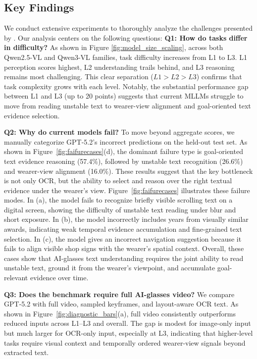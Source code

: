 \documentclass[11pt]{article}
\theoremstyle{plain}
\theoremstyle{definition}
\theoremstyle{remark}
\begin{document}
\subsection{Key Findings}
We conduct extensive experiments to thoroughly analyze the challenges presented by \dataset.  Our analysis centers on the following questions: 
\noindent\textbf{Q1: How do tasks differ in difficulty?}
As shown in Figure \ref{fig:model_size_scaling}, across both Qwen2.5-VL and Qwen3-VL families, task difficulty increases from L1 to L3. L1 perception scores highest, L2 understanding trails behind, and L3 reasoning remains most challenging. This clear separation ($L1 > L2 > L3$) confirms that task complexity grows with each level. Notably, the substantial performance gap between L1 and L3 (up to 20 points) suggests that current MLLMs struggle to move from reading unstable text to wearer-view alignment and goal-oriented text evidence selection.




\noindent\textbf{Q2: Why do current models fail?}
To move beyond aggregate scores, we manually categorize GPT-5.2's incorrect predictions on the held-out test set. As shown in Figure~\ref{fig:faifurecases}(d), the dominant failure type is {goal-oriented text evidence reasoning} (57.4\%), followed by {unstable text recognition} (26.6\%) and {wearer-view alignment} (16.0\%). These results suggest that the key bottleneck is not only OCR, but the ability to select and reason over the right textual evidence under the wearer's view. Figure~\ref{fig:faifurecases} illustrates these failure modes. In (a), the model fails to recognize briefly visible scrolling text on a digital screen, showing the difficulty of unstable text reading under blur and short exposure. In (b), the model incorrectly includes years from visually similar awards, indicating weak temporal evidence accumulation and fine-grained text selection. In (c), the model gives an incorrect navigation suggestion because it fails to align visible shop signs with the wearer's spatial context. Overall, these cases show that AI-glasses text understanding requires the joint ability to read unstable text, ground it from the wearer's viewpoint, and accumulate goal-relevant evidence over time. 

\noindent\textbf{Q3: Does the benchmark require full AI-glasses video?}
We compare GPT-5.2 with full video, sampled keyframes, and layout-aware OCR text. As shown in Figure~\ref{fig:diagnostic_bars}(a), full video consistently outperforms reduced inputs across L1--L3 and overall. The gap is modest for image-only input but much larger for OCR-only input, especially at L3, indicating that higher-level tasks require visual context and temporally ordered wearer-view signals beyond extracted text.
\end{document}
